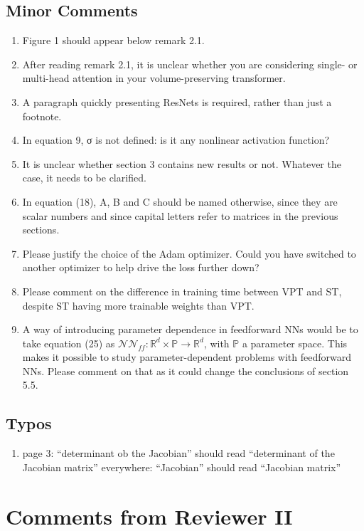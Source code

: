 \documentclass{article}
\begin{document}
\subsection*{Minor Comments}

\begin{enumerate}
\item Figure 1 should appear below remark 2.1.
\item After reading remark 2.1, it is unclear whether you are considering single- or multi-head attention in your volume-preserving transformer.
\item A paragraph quickly presenting ResNets is required, rather than just a footnote.
\item In equation 9, σ is not defined: is it any nonlinear activation function?
\item It is unclear whether section 3 contains new results or not. Whatever the case, it needs to be clarified.
\item In equation (18), A, B and C should be named otherwise, since they are scalar numbers and since capital letters refer to matrices in the previous sections.
\item Please justify the choice of the Adam optimizer. Could you have switched to another optimizer to help drive the loss further down?
\item Please comment on the difference in training time between VPT and ST, despite ST having more trainable weights than VPT.
\item A way of introducing parameter dependence in feedforward NNs would be to take equation (25) as $\mathcal{NN}_{ff}: \mathbb{R}^d\times\mathbb{P}\to\mathbb{R}^d$, with $\mathbb{P}$ a parameter space. This makes it possible to study parameter-dependent problems with feedforward NNs. Please comment on that as it could change the conclusions of section 5.5.
\end{enumerate}

\subsection*{Typos}
\begin{enumerate}
    \item page 3: ``determinant ob the Jacobian'' should read ``determinant of the Jacobian matrix'' everywhere: ``Jacobian'' should read ``Jacobian matrix''
\end{enumerate}

\section{Comments from Reviewer II}
\end{document}
